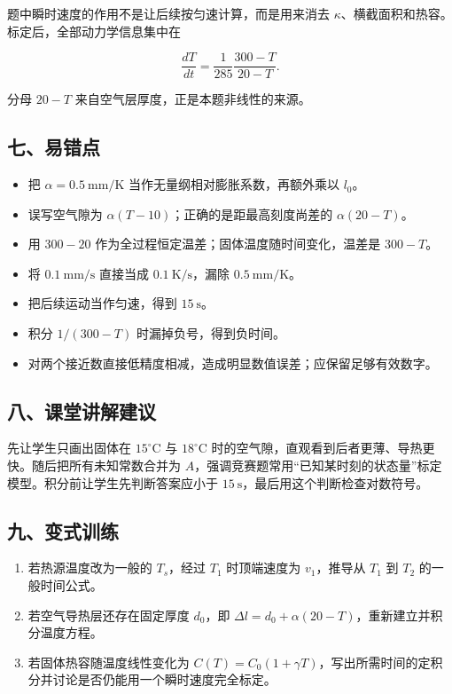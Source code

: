 \documentclass[12pt,a4paper,UTF8]{ctexart}
\newcommand{\tightlist}{\setlength{\itemsep}{0pt}\setlength{\parskip}{0pt}}
\begin{document}
题中瞬时速度的作用不是让后续按匀速计算，而是用来消去
\(\kappa\)、横截面积和热容。标定后，全部动力学信息集中在

\[\frac{dT}{dt}=\frac1{285}\frac{300-T}{20-T}.\]

分母 \(20-T\) 来自空气层厚度，正是本题非线性的来源。

\subsection{七、易错点}\label{ux4e03ux6613ux9519ux70b9-6}

\begin{itemize}
\tightlist
\item
  把 \(\alpha=0.5\ \mathrm{mm/K}\) 当作无量纲相对膨胀系数，再额外乘以
  \(l_0\)。
\item
  误写空气隙为 \(\alpha(T-10)\)；正确的是距最高刻度尚差的
  \(\alpha(20-T)\)。
\item
  用 \(300-20\) 作为全过程恒定温差；固体温度随时间变化，温差是
  \(300-T\)。
\item
  将 \(0.1\ \mathrm{mm/s}\) 直接当成 \(0.1\ \mathrm{K/s}\)，漏除
  \(0.5\ \mathrm{mm/K}\)。
\item
  把后续运动当作匀速，得到 \(15\ \mathrm s\)。
\item
  积分 \(1/(300-T)\) 时漏掉负号，得到负时间。
\item
  对两个接近数直接低精度相减，造成明显数值误差；应保留足够有效数字。
\end{itemize}

\subsection{八、课堂讲解建议}\label{ux516bux8bfeux5802ux8bb2ux89e3ux5efaux8bae-6}

先让学生只画出固体在 \(15^\circ\mathrm C\) 与 \(18^\circ\mathrm C\)
时的空气隙，直观看到后者更薄、导热更快。随后把所有未知常数合并为
\(A\)，强调竞赛题常用``已知某时刻的状态量''标定模型。积分前让学生先判断答案应小于
\(15\ \mathrm s\)，最后用这个判断检查对数符号。

\subsection{九、变式训练}\label{ux4e5dux53d8ux5f0fux8badux7ec3-6}

\begin{enumerate}
\def\labelenumi{\arabic{enumi}.}
\tightlist
\item
  若热源温度改为一般的 \(T_s\)，经过 \(T_1\) 时顶端速度为
  \(v_1\)，推导从 \(T_1\) 到 \(T_2\) 的一般时间公式。
\item
  若空气导热层还存在固定厚度 \(d_0\)，即
  \(\Delta l=d_0+\alpha(20-T)\)，重新建立并积分温度方程。
\item
  若固体热容随温度线性变化为
  \(C(T)=C_0(1+\gamma T)\)，写出所需时间的定积分并讨论是否仍能用一个瞬时速度完全标定。
\end{enumerate}
\end{document}
